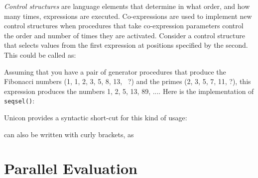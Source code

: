 \textit{Control structures} are language elements
that determine in what order, and how many times, expressions
are executed. Co-expressions are used to implement new
control structures when procedures that take
co-expression parameters control the order and number
of times they are activated.
Consider a control structure that selects values from the first
expression at positions specified by the second. This could be
called as:


Assuming that you have a pair of generator procedures
that produce the Fibonacci numbers (1, 1, 2, 3, 5, 8, 13, \ ?) and the
primes (2, 3, 5, 7, 11, ?), this expression produces the numbers 1, 2,
5, 13, 89, .... Here is the implementation of \texttt{seqsel()}:


\noindent
Unicon provides a syntactic short-cut for this kind of usage:


\noindent
can also be written with curly brackets, as


\section{Parallel Evaluation}

